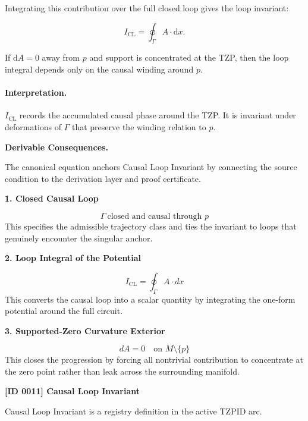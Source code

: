 Integrating this contribution over the full closed loop gives the loop invariant:

\begin{equation}
I_{\mathrm{CL}}
=
\oint_{\Gamma} A\cdot \mathrm{d}x .
\end{equation}

If $\mathrm{d}A=0$ away from $p$ and support is concentrated at the TZP, then the loop integral depends only on the causal winding around $p$.

\paragraph{Interpretation.}
$I_{\mathrm{CL}}$ records the accumulated causal phase around the TZP. It is invariant under deformations of $\Gamma$ that preserve the winding relation to $p$.

\par\vspace{0.35em}
\noindent\textbf{Derivable Consequences.}\quad
\begingroup
\footnotesize
\raggedright
The canonical equation anchors Causal Loop Invariant by connecting the source condition to the derivation layer and proof certificate.
\par\endgroup

\noindent\textbf{1. Closed Causal Loop}\par
\[
\Gamma \ \text{closed and causal through } p
\]
\noindent This specifies the admissible trajectory class and ties the invariant to loops that genuinely encounter the singular anchor.\par
\noindent\textbf{2. Loop Integral of the Potential}\par
\[
I_{\mathrm{CL}}
=
\oint_{\Gamma} A \cdot dx
\]
\noindent This converts the causal loop into a scalar quantity by integrating the one-form potential around the full circuit.\par
\noindent\textbf{3. Supported-Zero Curvature Exterior}\par
\[
dA = 0 \quad \text{on } M \setminus \{p\}
\]
\noindent This closes the progression by forcing all nontrivial contribution to concentrate at the zero point rather than leak across the surrounding manifold.\par

\clearpage
\noindent\textbf{[ID 0011] Causal Loop Invariant}\par
\vspace{0.35em}
\begingroup\small
{}
Causal Loop Invariant is a registry definition in the active TZPID arc.


